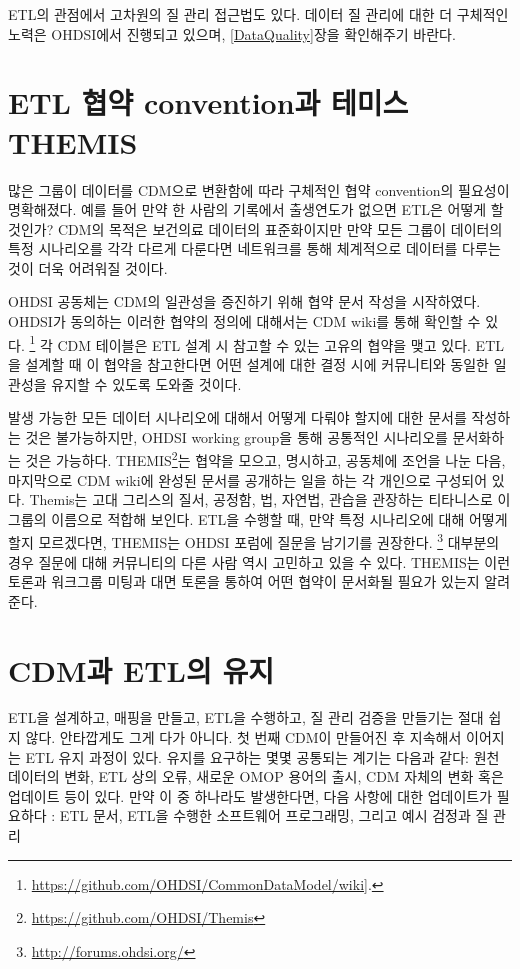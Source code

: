 \documentclass[10.5pt]{book}
\let\rmarkdownfootnote\footnote%
\def\footnote{\protect\rmarkdownfootnote}
\theoremstyle{definition}
\theoremstyle{definition}
\theoremstyle{definition}
\theoremstyle{remark}
\begin{document}
ETL의 관점에서 고차원의 질 관리 접근법도 있다. 데이터 질 관리에 대한 더
구체적인 노력은 OHDSI에서 진행되고 있으며, \ref{DataQuality}장을
확인해주기 바란다.

\section{ETL 협약 convention과 테미스
THEMIS}\label{etl--convention--themis}

많은 그룹이 데이터를 CDM으로 변환함에 따라 구체적인 협약 convention의
필요성이 명확해졌다. 예를 들어 만약 한 사람의 기록에서 출생연도가 없으면
ETL은 어떻게 할 것인가? CDM의 목적은 보건의료 데이터의 표준화이지만 만약
모든 그룹이 데이터의 특정 시나리오를 각각 다르게 다룬다면 네트워크를
통해 체계적으로 데이터를 다루는 것이 더욱 어려워질 것이다.

OHDSI 공동체는 CDM의 일관성을 증진하기 위해 협약 문서 작성을 시작하였다.
OHDSI가 동의하는 이러한 협약의 정의에 대해서는 CDM wiki를 통해 확인할 수
있다. \footnote{\url{https://github.com/OHDSI/CommonDataModel/wiki}{]}.}
각 CDM 테이블은 ETL 설계 시 참고할 수 있는 고유의 협약을 맺고 있다.
ETL을 설계할 때 이 협약을 참고한다면 어떤 설계에 대한 결정 시에
커뮤니티와 동일한 일관성을 유지할 수 있도록 도와줄 것이다.

발생 가능한 모든 데이터 시나리오에 대해서 어떻게 다뤄야 할지에 대한
문서를 작성하는 것은 불가능하지만, OHDSI working group을 통해 공통적인
시나리오를 문서화하는 것은 가능하다. THEMIS\footnote{\url{https://github.com/OHDSI/Themis}}는
협약을 모으고, 명시하고, 공동체에 조언을 나눈 다음, 마지막으로 CDM
wiki에 완성된 문서를 공개하는 일을 하는 각 개인으로 구성되어 있다.
Themis는 고대 그리스의 질서, 공정함, 법, 자연법, 관습을 관장하는
티타니스로 이 그룹의 이름으로 적합해 보인다. ETL을 수행할 때, 만약 특정
시나리오에 대해 어떻게 할지 모르겠다면, THEMIS는 OHDSI 포럼에 질문을
남기기를 권장한다. \footnote{\url{http://forums.ohdsi.org/}} 대부분의
경우 질문에 대해 커뮤니티의 다른 사람 역시 고민하고 있을 수 있다.
THEMIS는 이런 토론과 워크그룹 미팅과 대면 토론을 통하여 어떤 협약이
문서화될 필요가 있는지 알려준다.

\section{CDM과 ETL의 유지}\label{CDMandETLMaintenance}

ETL을 설계하고, 매핑을 만들고, ETL을 수행하고, 질 관리 검증을 만들기는
절대 쉽지 않다. 안타깝게도 그게 다가 아니다. 첫 번째 CDM이 만들어진 후
지속해서 이어지는 ETL 유지 과정이 있다. 유지를 요구하는 몇몇 공통되는
계기는 다음과 같다: 원천 데이터의 변화, ETL 상의 오류, 새로운 OMOP
용어의 출시, CDM 자체의 변화 혹은 업데이트 등이 있다. 만약 이 중
하나라도 발생한다면, 다음 사항에 대한 업데이트가 필요하다 : ETL 문서,
ETL을 수행한 소프트웨어 프로그래밍, 그리고 예시 검정과 질 관리
\end{document}
